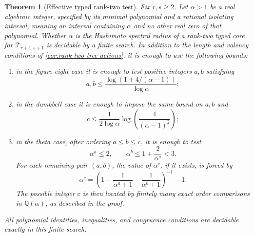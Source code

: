 \documentclass[11pt]{amsart}
\theoremstyle{plain}
\newtheorem{theorem}{Theorem}[section]
\theoremstyle{definition}
\theoremstyle{remark}
\newcommand{\T}{\mathcal T}
\newcommand{\QQ}{\mathbb Q}
\begin{document}
\begin{theorem}[Effective typed rank-two test]\label{thm:effective-rank-two}
Fix \(r,s\geq2\).  Let \(\alpha>1\) be a real algebraic integer, specified
by its minimal polynomial and a rational isolating interval, meaning an
interval containing \(\alpha\) and no other real zero of that polynomial.
Whether \(\alpha\) is
the Hashimoto spectral radius of a rank-two typed core for
\(\T_{r+1,s+1}\) is decidable by a finite search.  In addition to the
length and valency conditions of \cref{cor:rank-two-tree-actions}, it is
enough to use the following bounds:
\begin{enumerate}[label=\textup{(\roman*)}]
  \item in the figure-eight case it is enough to test positive integers
  \(a,b\) satisfying
  \begin{equation}\label{eq:figure-eight-bound}
    a,b\leq
    \frac{\log\!\left(1+4/(\alpha-1)\right)}{\log\alpha};
  \end{equation}
  \item in the dumbbell case it is enough to impose the same bound on
  \(a,b\) and
  \begin{equation}\label{eq:dumbbell-c-bound}
    c\leq
    \frac{1}{2\log\alpha}
    \log\!\left(\frac{4}{(\alpha-1)^2}\right);
  \end{equation}
  \item in the theta case, after ordering \(a\leq b\leq c\), it is enough
  to test
  \begin{equation}\label{eq:theta-ab-bound}
    \alpha^a\leq2,
    \qquad
    \alpha^b\leq1+\frac{2}{\alpha^a}<3.
  \end{equation}
  For each remaining pair \((a,b)\), the value of \(\alpha^c\), if it
  exists, is forced by
  \begin{equation}\label{eq:theta-c-forced}
    \alpha^c
    =
    \left(
      1-\frac{1}{\alpha^a+1}
       -\frac{1}{\alpha^b+1}
    \right)^{-1}-1.
  \end{equation}
  The possible integer \(c\) is then located by finitely many exact order
  comparisons in \(\QQ(\alpha)\), as described in the proof.
\end{enumerate}
All polynomial identities, inequalities, and congruence conditions are
decidable exactly in this finite search.
\end{theorem}
\end{document}
